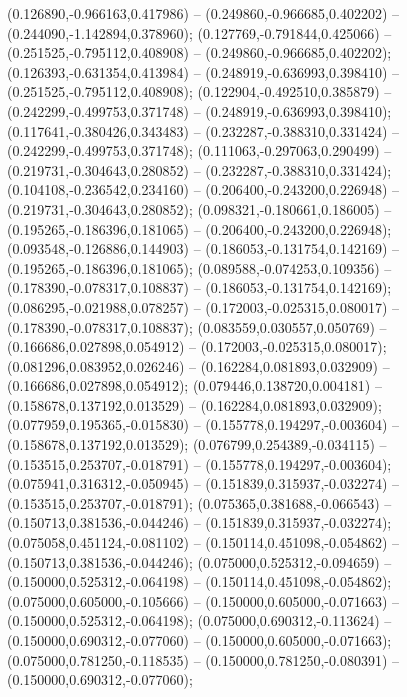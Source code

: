  (0.126890,-0.966163,0.417986) -- (0.249860,-0.966685,0.402202) -- (0.244090,-1.142894,0.378960);
 (0.127769,-0.791844,0.425066) -- (0.251525,-0.795112,0.408908) -- (0.249860,-0.966685,0.402202);
 (0.126393,-0.631354,0.413984) -- (0.248919,-0.636993,0.398410) -- (0.251525,-0.795112,0.408908);
 (0.122904,-0.492510,0.385879) -- (0.242299,-0.499753,0.371748) -- (0.248919,-0.636993,0.398410);
 (0.117641,-0.380426,0.343483) -- (0.232287,-0.388310,0.331424) -- (0.242299,-0.499753,0.371748);
 (0.111063,-0.297063,0.290499) -- (0.219731,-0.304643,0.280852) -- (0.232287,-0.388310,0.331424);
 (0.104108,-0.236542,0.234160) -- (0.206400,-0.243200,0.226948) -- (0.219731,-0.304643,0.280852);
 (0.098321,-0.180661,0.186005) -- (0.195265,-0.186396,0.181065) -- (0.206400,-0.243200,0.226948);
 (0.093548,-0.126886,0.144903) -- (0.186053,-0.131754,0.142169) -- (0.195265,-0.186396,0.181065);
 (0.089588,-0.074253,0.109356) -- (0.178390,-0.078317,0.108837) -- (0.186053,-0.131754,0.142169);
 (0.086295,-0.021988,0.078257) -- (0.172003,-0.025315,0.080017) -- (0.178390,-0.078317,0.108837);
 (0.083559,0.030557,0.050769) -- (0.166686,0.027898,0.054912) -- (0.172003,-0.025315,0.080017);
 (0.081296,0.083952,0.026246) -- (0.162284,0.081893,0.032909) -- (0.166686,0.027898,0.054912);
 (0.079446,0.138720,0.004181) -- (0.158678,0.137192,0.013529) -- (0.162284,0.081893,0.032909);
 (0.077959,0.195365,-0.015830) -- (0.155778,0.194297,-0.003604) -- (0.158678,0.137192,0.013529);
 (0.076799,0.254389,-0.034115) -- (0.153515,0.253707,-0.018791) -- (0.155778,0.194297,-0.003604);
 (0.075941,0.316312,-0.050945) -- (0.151839,0.315937,-0.032274) -- (0.153515,0.253707,-0.018791);
 (0.075365,0.381688,-0.066543) -- (0.150713,0.381536,-0.044246) -- (0.151839,0.315937,-0.032274);
 (0.075058,0.451124,-0.081102) -- (0.150114,0.451098,-0.054862) -- (0.150713,0.381536,-0.044246);
 (0.075000,0.525312,-0.094659) -- (0.150000,0.525312,-0.064198) -- (0.150114,0.451098,-0.054862);
 (0.075000,0.605000,-0.105666) -- (0.150000,0.605000,-0.071663) -- (0.150000,0.525312,-0.064198);
 (0.075000,0.690312,-0.113624) -- (0.150000,0.690312,-0.077060) -- (0.150000,0.605000,-0.071663);
 (0.075000,0.781250,-0.118535) -- (0.150000,0.781250,-0.080391) -- (0.150000,0.690312,-0.077060);
